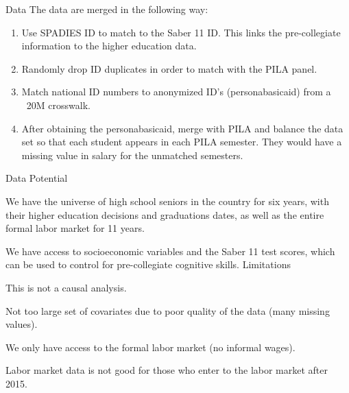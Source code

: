 \documentclass[11pt, aspectratio=169]{beamer}
\newenvironment{wideitemize}{\itemize\addtolength{\itemsep}{10pt}}{\enditemize}
\begin{document}
\begin{frame}{Data}
    The data are merged in the following way:
    \vspace{0.2cm}
    \begin{enumerate}
        \item Use SPADIES ID to match to the Saber 11 ID. This links the pre-collegiate information to the higher education data.
        \item Randomly drop ID duplicates in order to match with the PILA panel.
        \item Match national ID numbers to anonymized ID’s (personabasicaid) from a ~20M crosswalk.
        \item After obtaining the personabasicaid, merge with PILA and balance the data set so that each student appears in each PILA semester. They would have a missing value in salary for the unmatched semesters.
    \end{enumerate}

\end{frame}

\begin{frame}{Data}
    Potential
    \begin{wideitemize}
        \item We have the universe of high school seniors in the country for six years, with their higher education decisions and graduations dates, as well as the entire formal labor market for 11 years.
        \item We have access to socioeconomic variables and the Saber 11 test scores, which can be used to control for pre-collegiate cognitive skills.
    \end{wideitemize}
    Limitations
    \begin{wideitemize}
        \item This is not a causal analysis.
        \item Not too large set of covariates due to poor quality of the data (many missing values).
        \item We only have access to the formal labor market (no informal wages).
        \item Labor market data is not good for those who enter to the labor market after 2015. 
    \end{wideitemize}   
\end{frame}
\end{document}
